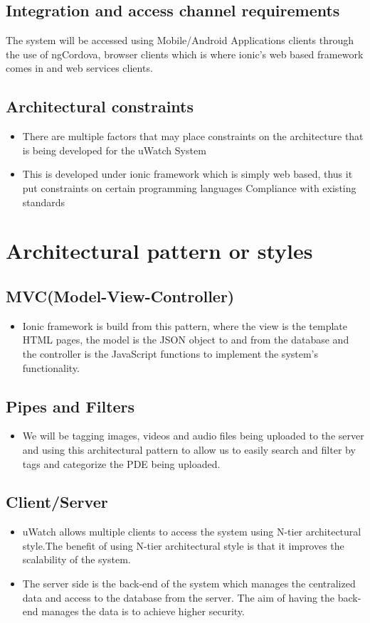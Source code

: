\documentclass[a4paper,12pt]{article}
\begin{document}
\subsection{Integration and access channel requirements}
The system will be accessed using Mobile/Android Applications clients through the use of ngCordova,  browser clients which is where ionic's web based framework comes in and web services clients.
\subsection{Architectural constraints}
\begin{itemize}
\item There are multiple factors that may place constraints on the architecture that
is being developed for the uWatch System

\item This is developed under ionic framework which is simply web based, thus it put constraints on certain programming languages Compliance with existing standards
\end{itemize}
\section{Architectural pattern or styles}
		\subsection{MVC(Model-View-Controller)}
			\begin{itemize}
				\item Ionic framework is build from this pattern, where the view is the template HTML pages, the model is the JSON object to and from the database and the controller is the JavaScript functions to implement the system's functionality.
			\end{itemize}
		\subsection{Pipes and Filters}
		\begin{itemize}
		\item We will be tagging images, videos and audio files being uploaded to the server and using this architectural pattern to allow us to easily search and filter by tags and categorize the PDE being uploaded.
		\end{itemize}
		\subsection{Client/Server} 
			\begin{itemize}
				\item uWatch allows multiple clients to access the system using N-tier
				architectural style.The benefit of using N-tier architectural style is that
				it improves the scalability of the system.
				\item The server side is the back-end of the system which manages the centralized data and access to the database from the server. The aim of
having the back-end manages the data is to achieve higher security. 
			\end{itemize}
\end{document}
